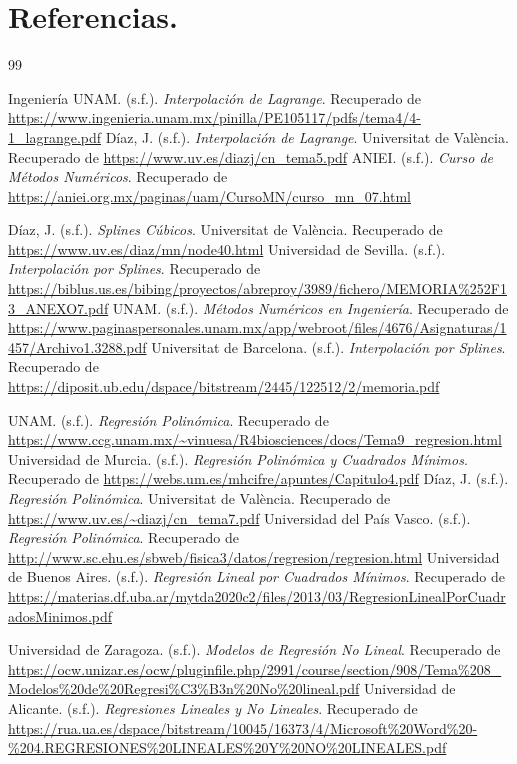 \documentclass{article}
\begin{document}
\newpage
\section{Referencias.}
\renewcommand{\refname}{}
\renewcommand{\bibname}{}
\vspace{-10mm}
\begin{thebibliography}{99}

 Ingeniería UNAM. (s.f.). \textit{Interpolación de Lagrange}. Recuperado de \url{https://www.ingenieria.unam.mx/pinilla/PE105117/pdfs/tema4/4-1_lagrange.pdf}
 Díaz, J. (s.f.). \textit{Interpolación de Lagrange}. Universitat de València. Recuperado de \url{https://www.uv.es/diazj/cn_tema5.pdf}
 ANIEI. (s.f.). \textit{Curso de Métodos Numéricos}. Recuperado de \url{https://aniei.org.mx/paginas/uam/CursoMN/curso_mn_07.html}

 Díaz, J. (s.f.). \textit{Splines Cúbicos}. Universitat de València. Recuperado de \url{https://www.uv.es/diaz/mn/node40.html}
 Universidad de Sevilla. (s.f.). \textit{Interpolación por Splines}. Recuperado de \url{https://biblus.us.es/bibing/proyectos/abreproy/3989/fichero/MEMORIA%252F13_ANEXO7.pdf}
 UNAM. (s.f.). \textit{Métodos Numéricos en Ingeniería}. Recuperado de \url{https://www.paginaspersonales.unam.mx/app/webroot/files/4676/Asignaturas/1457/Archivo1.3288.pdf}
 Universitat de Barcelona. (s.f.). \textit{Interpolación por Splines}. Recuperado de \url{https://diposit.ub.edu/dspace/bitstream/2445/122512/2/memoria.pdf}

 UNAM. (s.f.). \textit{Regresión Polinómica}. Recuperado de \url{https://www.ccg.unam.mx/~vinuesa/R4biosciences/docs/Tema9_regresion.html}
 Universidad de Murcia. (s.f.). \textit{Regresión Polinómica y Cuadrados Mínimos}. Recuperado de \url{https://webs.um.es/mhcifre/apuntes/Capitulo4.pdf}
 Díaz, J. (s.f.). \textit{Regresión Polinómica}. Universitat de València. Recuperado de \url{https://www.uv.es/~diazj/cn_tema7.pdf}
 Universidad del País Vasco. (s.f.). \textit{Regresión Polinómica}. Recuperado de \url{http://www.sc.ehu.es/sbweb/fisica3/datos/regresion/regresion.html}
 Universidad de Buenos Aires. (s.f.). \textit{Regresión Lineal por Cuadrados Mínimos}. Recuperado de \url{https://materias.df.uba.ar/mytda2020c2/files/2013/03/RegresionLinealPorCuadradosMinimos.pdf}

 Universidad de Zaragoza. (s.f.). \textit{Modelos de Regresión No Lineal}. Recuperado de \url{https://ocw.unizar.es/ocw/pluginfile.php/2991/course/section/908/Tema%208_Modelos%20de%20Regresi%C3%B3n%20No%20lineal.pdf}
 Universidad de Alicante. (s.f.). \textit{Regresiones Lineales y No Lineales}. Recuperado de \url{https://rua.ua.es/dspace/bitstream/10045/16373/4/Microsoft%20Word%20-%204.REGRESIONES%20LINEALES%20Y%20NO%20LINEALES.pdf}
\end{thebibliography}
\end{document}
